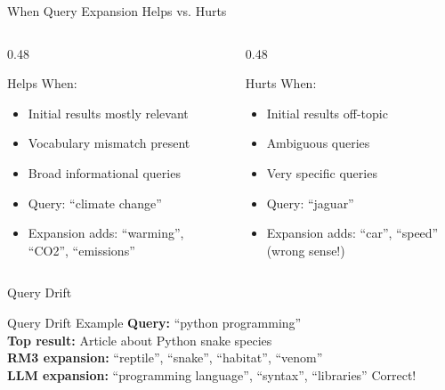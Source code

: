 \documentclass[aspectratio=169]{beamer}
\newif\ifanimated
\newcommand{\cpause}{\ifanimated\pause\fi}
\begin{document}
\begin{frame}{When Query Expansion Helps vs. Hurts}
\begin{columns}
\begin{column}{0.48\textwidth}
\begin{block}{\checkmark Helps When:}
\begin{itemize}
    \item Initial results mostly relevant
    \item Vocabulary mismatch present
    \item Broad informational queries
    \item Query: ``climate change''
    \item Expansion adds: ``warming'', ``CO2'', ``emissions''
\end{itemize}\cpause
\end{block}
\end{column}

\begin{column}{0.48\textwidth}
\begin{alertblock}{ Hurts When:}
\begin{itemize}
    \item Initial results off-topic
    \item Ambiguous queries
    \item Very specific queries
    \item Query: ``jaguar''
    \item Expansion adds: ``car'', ``speed'' (wrong sense!)
\end{itemize}\cpause
\end{alertblock}
\end{column}
\end{columns}

\vspace{1em}

\end{frame}


\begin{frame}{Query Drift}

\begin{exampleblock}{Query Drift Example}
\textbf{Query:} ``python programming'' \\
\textbf{Top result:} Article about Python snake species \\
\textbf{RM3 expansion:} ``reptile'', ``snake'', ``habitat'', ``venom'' \\
\textbf{LLM expansion:} ``programming language'', ``syntax'', ``libraries'' \textcolor{green}{\checkmark} Correct!
\end{exampleblock}
\end{frame}
\end{document}
